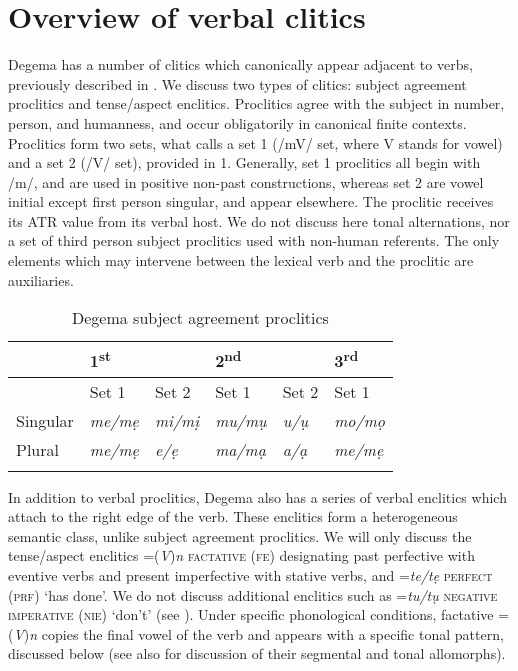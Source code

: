 \documentclass[output=paper]{langsci/langscibook}
\begin{document}
\section{Overview of verbal clitics}

Degema has a number of clitics which canonically appear adjacent to verbs, previously described in \citet{Kari2002a,Kari2002b,Kari2002c,Kari2002d,Kari2003b,Kari2004,Kari2005}. We discuss two types of clitics: subject agreement proclitics and tense/aspect enclitics. Proclitics agree with the subject in number, person, and humanness, and occur obligatorily in canonical finite contexts. Proclitics form two sets, what \citet[333-335]{Kari2004} calls a set 1 (/mV/ set, where V stands for vowel) and a set 2 (/V/ set), provided in 1. Generally, set 1 proclitics all begin with /m/, and are used in positive non-past constructions, whereas set 2 are vowel initial except first person singular, and appear elsewhere. The proclitic receives its ATR value from its verbal host. We do not discuss here tonal alternations, nor a set of third person subject proclitics used with non-human referents. The only elements which may intervene between the lexical verb and the proclitic are auxiliaries.

\begin{table}


\begin{tabularx}{\textwidth}{XXXXXX}
\lsptoprule
    & \multicolumn{2}{X}{ 1\textsuperscript{st}} &\multicolumn{2}{X}{ 2\textsuperscript{nd}} & 3\textsuperscript{rd}\\
    \midrule
    & {Set 1} & {Set 2} & {Set 1} & {Set 2} & {Set 1}\\
{Singular} & {\itshape me/mẹ} & {\itshape mi/mị} & {\itshape mu/mụ} & {\itshape u/ụ} & {\itshape mo/mọ}\\
{Plural} & {\itshape me/mẹ} & {\itshape e/ẹ} & {\itshape ma/mạ} & {\itshape a/ạ} & {\itshape me/mẹ}\\
\lspbottomrule
\end{tabularx}
\caption{Degema subject agreement proclitics}
\label{bkm:Ref447870844}
\end{table}


In addition to verbal proclitics, Degema also has a series of verbal enclitics which attach to the right edge of the verb. These enclitics form a heterogeneous semantic class, unlike subject agreement proclitics. We will only discuss the tense/aspect enclitics =(\textit{V})\textit{n} \textsc{factative (fe)} designating past perfective with eventive verbs and present imperfective with stative verbs, and =\textit{te/tẹ} \textsc{perfect} (\textsc{prf}) ‘has done’. We do not discuss additional enclitics such as =\textit{tu/tụ} \textsc{negative imperative (nie)} ‘don’t’ (see \citealt{Kari2004}). Under specific phonological conditions, factative =(\textit{V})\textit{n} copies the final vowel of the verb and appears with a specific tonal pattern, discussed below (see also \citealt[340-342]{Kari2004}  for discussion of their segmental and tonal allomorphs).   
\end{document}
